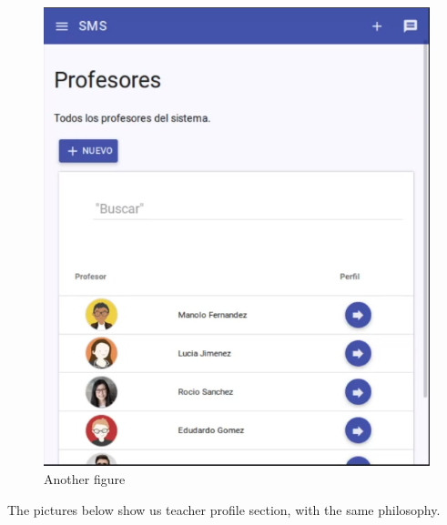 \begin{figure}[H]
\begin{minipage}{.5\textwidth}
  \includegraphics[scale=0.3]{img/snaps/teachers_list.png}
  \caption{Another figure}
\end{minipage}
\end{figure}

\noindent The pictures below show us teacher profile section, with
the same philosophy.

